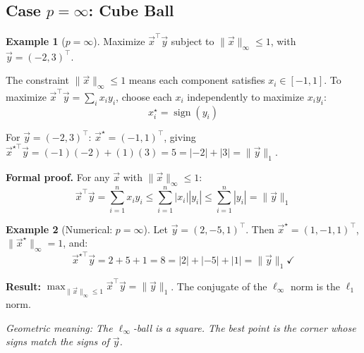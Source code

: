 \documentclass[10pt, twocolumn]{article}
\theoremstyle{definition}
\newtheorem{example}{Example}
\theoremstyle{plain}
\DeclareMathOperator{\sign}{sign}
\begin{document}
\subsection{Case $p = \infty$: Cube Ball}

\begin{example}[$p = \infty$]
Maximize $\vec{x}^\top \vec{y}$ subject to $\|\vec{x}\|_\infty \le 1$, with $\vec{y} = (-2, 3)^\top$.
\end{example}

The constraint $\|\vec{x}\|_\infty \le 1$ means each component satisfies $x_i \in [-1, 1]$. To maximize $\vec{x}^\top \vec{y} = \sum_i x_i y_i$, choose each $x_i$ independently to maximize $x_i y_i$:
\[
    x_i^\star = \sign(y_i)
\]

For $\vec{y} = (-2, 3)^\top$: $\vec{x}^\star = (-1, 1)^\top$, giving $\vec{x}^{\star\top} \vec{y} = (-1)(-2) + (1)(3) = 5 = |-2| + |3| = \|\vec{y}\|_1$.

\textbf{Formal proof.} For any $\vec{x}$ with $\|\vec{x}\|_\infty \le 1$:
\[
    \vec{x}^\top \vec{y} = \sum_{i=1}^{n} x_i y_i \le \sum_{i=1}^{n} |x_i| |y_i| \le \sum_{i=1}^{n} |y_i| = \|\vec{y}\|_1
\]

\begin{example}[Numerical: $p = \infty$]
Let $\vec{y} = (2, -5, 1)^\top$. Then $\vec{x}^\star = (1, -1, 1)^\top$, $\|\vec{x}^\star\|_\infty = 1$, and:
\[
    \vec{x}^{\star\top} \vec{y} = 2 + 5 + 1 = 8 = |2| + |-5| + |1| = \|\vec{y}\|_1 \checkmark
\]
\end{example}

\begin{tcolorbox}[colframe=black!50]
\textbf{Result:} $\displaystyle\max_{\|\vec{x}\|_\infty \le 1} \vec{x}^\top \vec{y} = \|\vec{y}\|_1$. The conjugate of the $\ell_\infty$ norm is the $\ell_1$ norm.
\end{tcolorbox}

\textit{Geometric meaning: The $\ell_\infty$-ball is a square. The best point is the corner whose signs match the signs of $\vec{y}$.}

\begin{center}
\end{center}
\end{document}

